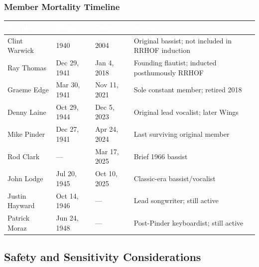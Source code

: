 \documentclass[11pt,letterpaper]{article}
\newcommand{\tableheader}[1]{\textbf{\sffamily\textcolor{white}{#1}}}
\begin{document}
\subsubsection{Member Mortality Timeline}

\begin{center}
\begin{tabularx}{\textwidth}{L{3cm}C{2.5cm}C{2.5cm}X}
\toprule
{}
\tableheader{Member} & \tableheader{Born} & \tableheader{Died} & \tableheader{Notes} \\
\midrule
Clint Warwick & 1940 & 2004 & Original bassist; not included in RRHOF induction \\
Ray Thomas & Dec 29, 1941 & Jan 4, 2018 & Founding flautist; inducted posthumously RRHOF \\
Graeme Edge & Mar 30, 1941 & Nov 11, 2021 & Sole constant member; retired 2018 \\
Denny Laine & Oct 29, 1944 & Dec 5, 2023 & Original lead vocalist; later Wings \\
Mike Pinder & Dec 27, 1941 & Apr 24, 2024 & Last surviving original member \\
Rod Clark & --- & Mar 17, 2025 & Brief 1966 bassist \\
John Lodge & Jul 20, 1945 & Oct 10, 2025 & Classic-era bassist/vocalist \\
Justin Hayward & Oct 14, 1946 & --- & Lead songwriter; still active \\
Patrick Moraz & Jun 24, 1948 & --- & Post-Pinder keyboardist; still active \\
\bottomrule
\end{tabularx}
\end{center}

\subsection{Safety and Sensitivity Considerations}
\end{document}
